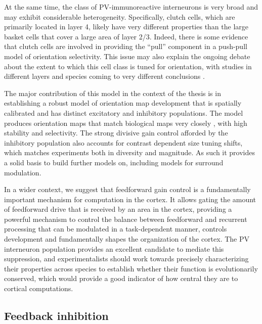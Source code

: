 At the same time, the class of PV-immunoreactive interneurons is very
broad and may exhibit considerable
heterogeneity. Specifically, clutch cells, which are primarily located
in layer 4, likely have very different properties than the large basket
cells that cover a large area of layer 2/3. Indeed, there is some evidence
that clutch cells are involved in providing the ``pull'' component in a
push-pull model of orientation selectivity. This issue may also explain the
ongoing debate about the extent to which this cell class is tuned for
orientation, with studies in different layers and species coming to
very different conclusions \citep{Cardin2007, Ma2011, Hofer2011}.

The major contribution of this model in the context of the thesis is
in establishing a robust model of orientation map development that is
spatially calibrated and has distinct excitatory and inhibitory
populations. The model produces orientation maps that match
biological maps very closely \citep{Kaschube2010, Stevens2013}, with
high stability and selectivity.  The strong divisive gain control
afforded by the inhibitory population also accounts for contrast
dependent size tuning shifts, which matches experiments both in
diversity and magnitude. As such it provides a solid basis to build
further models on, including models for surround modulation. 

In a wider context, we suggest that feedforward gain control is a
fundamentally important mechanism for computation in the cortex. It
allows gating the amount of feedforward drive that is received by an
area in the cortex, providing a powerful mechanism to control the
balance between feedforward and recurrent processing that can be
modulated in a task-dependent manner, controls development and
fundamentally shapes the organization of the cortex. The PV
interneuron population provides an excellent candidate to mediate this
suppression, and experimentalists should work towards precisely
characterizing their properties across species to establish whether
their function is evolutionarily conserved, which would provide a good
indicator of how central they are to cortical computations.

\subsection{Feedback inhibition}

